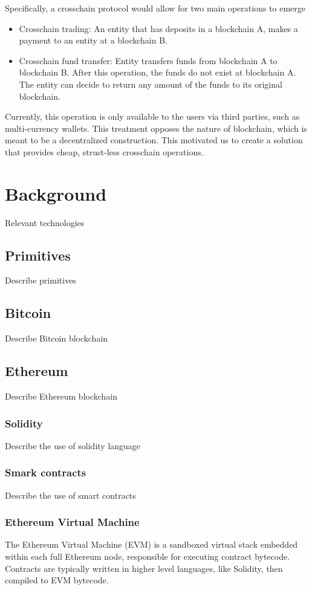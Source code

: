 \documentclass{article}
\begin{document}
Specifically, a crosschain protocol would allow for two main operations to emerge
\begin{itemize}
\item Crosschain trading: An entity that has deposits in a blockchain A, makes
    a payment to an entity at a blockchain B.
\item Crosschain fund transfer: Entity transfers funds from blockchain A to
    blockchain B. After this operation, the funds do not exist at blockchain A.
    The entity can decide to return any amount of the funds to its original blockchain.
\end{itemize}

Currently, this operation is only available to the users via third parties,
such as multi-currency wallets. This treatment opposes the nature of
blockchain, which is meant to be a decentralized construction. This motivated
us to create a solution that provides cheap, strust-less crosschain operations.


\section{Background}
Relevant technologies
\subsection{Primitives}
Describe primitives
\subsection{Bitcoin}
Describe Bitcoin blockchain
\subsection{Ethereum}
Describe Ethereum blockchain
\subsubsection{Solidity}
Describe the use of solidity language
\subsubsection{Smark contracts}
Describe the use of smart contracts
\subsubsection{Ethereum Virtual Machine}
The Ethereum Virtual Machine (EVM) is a sandboxed virtual stack embedded within each full Ethereum node, responsible for executing contract bytecode. Contracts are typically written in higher level languages, like Solidity, then compiled to EVM bytecode.
\end{document}
